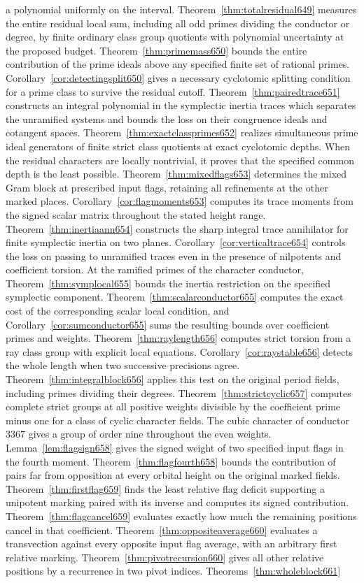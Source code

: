 \documentclass[a4paper,11pt]{article}
\theoremstyle{definition}
\theoremstyle{remark}
\numberwithin{equation}{section}
\begin{document}
a polynomial uniformly on the interval. Theorem~\ref{thm:totalresidual649} measures the entire residual local sum, including all odd primes dividing the conductor or degree, by finite ordinary class group quotients with polynomial uncertainty at the proposed budget. Theorem~\ref{thm:primemass650} bounds the entire contribution of the prime ideals above any specified finite set of rational primes. Corollary~\ref{cor:detectingsplit650} gives a necessary cyclotomic splitting condition for a prime class to survive the residual cutoff. Theorem~\ref{thm:pairedtrace651} constructs an integral polynomial in the symplectic inertia traces which separates the unramified systems and bounds the loss on their congruence ideals and cotangent spaces. Theorem~\ref{thm:exactclassprimes652} realizes simultaneous prime ideal generators of finite strict class quotients at exact cyclotomic depths. When the residual characters are locally nontrivial, it proves that the specified common depth is the least possible. Theorem~\ref{thm:mixedflags653} determines the mixed Gram block at prescribed input flags, retaining all refinements at the other marked places. Corollary~\ref{cor:flagmoments653} computes its trace moments from the signed scalar matrix throughout the stated height range. Theorem~\ref{thm:inertiaann654} constructs the sharp integral trace annihilator for finite symplectic inertia on two planes. Corollary~\ref{cor:verticaltrace654} controls the loss on passing to unramified traces even in the presence of nilpotents and coefficient torsion. At the ramified primes of the character conductor, Theorem~\ref{thm:symplocal655} bounds the inertia restriction on the specified symplectic component. Theorem~\ref{thm:scalarconductor655} computes the exact cost of the corresponding scalar local condition, and Corollary~\ref{cor:sumconductor655} sums the resulting bounds over coefficient primes and weights. Theorem~\ref{thm:raylength656} computes strict torsion from a ray class group with explicit local equations. Corollary~\ref{cor:raystable656} detects the whole length when two successive precisions agree. Theorem~\ref{thm:integralblock656} applies this test on the original period fields, including primes dividing their degrees. Theorem~\ref{thm:strictcyclic657} computes complete strict groups at all positive weights divisible by the coefficient prime minus one for a class of cyclic character fields. The cubic character of conductor 3367 gives a group of order nine throughout the even weights. Lemma~\ref{lem:flagsign658} gives the signed weight of two specified input flags in the fourth moment. Theorem~\ref{thm:flagfourth658} bounds the contribution of pairs far from opposition at every orbital height on the original marked fields. Theorem~\ref{thm:firstflag659} finds the least relative flag deficit supporting a unipotent marking paired with its inverse and computes its signed contribution. Theorem~\ref{thm:flagcancel659} evaluates exactly how much the remaining positions cancel in that coefficient. Theorem~\ref{thm:oppositeaverage660} evaluates a transvection against every opposite input flag average, with an arbitrary first relative marking. Theorem~\ref{thm:pivotrecursion660} gives all other relative positions by a recurrence in two pivot indices. Theorems~\ref{thm:wholeblock661} 
\end{document}
